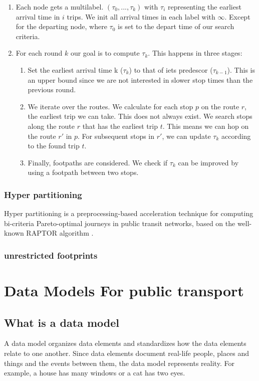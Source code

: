 \begin{enumerate}
    \item Each node gets a multilabel. $(\tau_0,...,\tau_k)$ with $\tau_i$ representing the earliest arrival time in $i$ trips. We init all arrival times in each label with $\infty$. Except for the departing node, where $\tau_0$ is set to the depart time of our search criteria.
    \item For each round $k$ our goal is to compute $\tau_k$. This happens in three stages:\begin{enumerate}
        \item Set the earliest arrival time k ($\tau_k$) to that of iets predescor ($\tau_{k-1}$). This is an upper bound since we are not interested in slower stop times than the previous round.
        \item We iterate over the routes. We calculate for each stop $p$ on the route $r$, the earliest trip we can take. This does not always exist. We search stops along the route $r$ that has the earliest trip $t$. This means we can hop on the route $r'$ in $p$. For subsequent stops in $r'$, we can update $\tau_k$ according to the found trip $t$.
        \item Finally, footpaths are considered. We check if $\tau_k$ can be improved by using a footpath between two stops. 
    \end{enumerate}
\end{enumerate}

\subsubsection{Hyper partitioning}
Hyper partitioning is a preprocessing-based acceleration technique for computing bi-criteria Pareto-optimal journeys in public transit networks, based on the well-known RAPTOR algorithm \cite{delling_round-based_2015}.
\subsubsection{unrestricted footprints}
\section{Data Models For public transport}\label{section:data_model_rel_work}
\subsection{What is a data model }
A data model organizes data elements and standardizes how the data elements relate to one another. Since data elements document real-life people, places and things and the events between them, the data model represents reality. For example, a house has many windows or a cat has two eyes.

